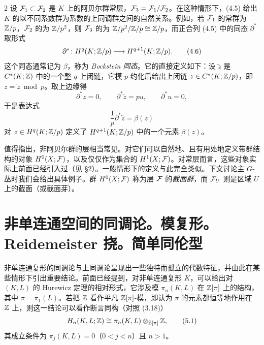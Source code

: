 \begin{example}{2}
设 $\mathcal{F}_1\subset\mathcal{F}_2$ 是 $K$ 上的阿贝尔群常层，$\mathcal{F}_3=\mathcal{F}_1/\mathcal{F}_2$。在这种情形下，(4.5) 给出 $K$ 的以不同系数群为系数的上同调群之间的自然关系。例如，若 $\mathcal{F}_1$ 的常群为 $\mathbb{Z}/p$，$\mathcal{F}_2$ 的为 $\mathbb{Z}/p^2$，则 $\mathcal{F}_3$ 的为 $\mathbb{Z}/p^2/\mathbb{Z}/p\cong\mathbb{Z}/p$，而正合列 (4.5) 中的同态 $\partial^*$ 取形式
\begin{equation}
  \partial^*\colon H^q(K;\mathbb{Z}/p)\longrightarrow H^{q+1}(K;\mathbb{Z}/p). \tag{4.6}
\end{equation}
这个同态通常记为 $\beta$，称为 \emph{Bockstein 同态}。它的直接定义如下：设 $\tilde z$ 是 $C^*(K;\mathbb{Z})$ 中的一个整 $q$-上闭链，它模 $p$ 约化后给出上闭链 $z\in C^*(K;\mathbb{Z}/p)$，即 $z=\tilde z\bmod p$。取上边缘得
\[
  \partial^*z=0,\qquad \partial^*\tilde z=pu,\qquad \partial^*u=0,
\]
于是表达式
\[
  \frac{1}{p}\partial^*\tilde z=\beta(z)
\]
对 $z\in H^q(K;\mathbb{Z}/p)$ 定义了 $H^{q+1}(K;\mathbb{Z}/p)$ 中的一个元素 $\beta(z)$。
\end{example}

\begin{remark}{}
值得指出，非阿贝尔群的层相当常见。对它们可以自然地、且有用处地定义带群结构的对象 $H^0(X;\mathcal{F})$，以及仅仅作为集合的 $H^1(X;\mathcal{F})$。对常层而言，这些对象实际上前面已经引入过（见 §2）。一般情形下的定义与此完全类似。下文讨论主 $G$-丛时我们会给出具体例子。群 $H^0(X;\mathcal{F})$ 称为层 $\mathcal{F}$ 的\emph{截面群}，而 $\mathcal{F}_U$ 则是区域 $U$ 上的截面（或截面芽）。
\end{remark}

\section{非单连通空间的同调论。模复形。Reidemeister 挠。简单同伦型}

非单连通复形的同调论与上同调论呈现出一些独特而孤立的代数特征，并由此在某些情形下引出重要结论。前面已经提到，对非单连通复形 $K$，可以给出对 $(K,L)$ 的 Hurewicz 定理的相对形式，它涉及模 $\pi_n(K,L)$ 在 $\mathbb{Z}[\pi]$ 上的结构，其中 $\pi=\pi_1(L)$。若把 $\mathbb{Z}$ 看作平凡 $\mathbb{Z}[\pi]$-模，即认为 $\pi$ 的元素都恒等地作用在 $\mathbb{Z}$ 上，则这一结论可以看作断言同构（对照 (3.18)）
\begin{equation}
  H_n(K,L;\mathbb{Z})\cong\pi_n(K,L)\otimes_{\mathbb{Z}[\pi]}\mathbb{Z}, \tag{5.1}
\end{equation}
其成立条件为 $\pi_j(K,L)=0$（$0<j<n$）且 $n>1$。

